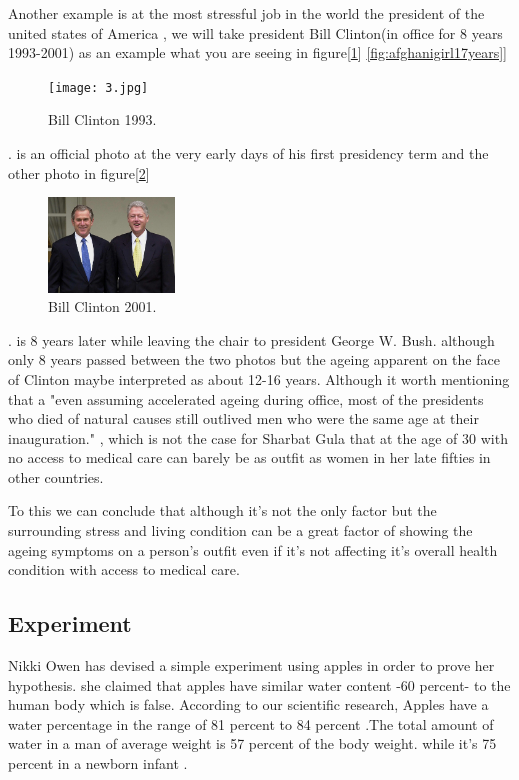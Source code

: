 \documentclass[12pt]{article}
\theoremstyle{plain}
\theoremstyle{definition}
\theoremstyle{remark}
\begin{document}
\begin{itemize}
Another example is at the most stressful job in the world the president of the united states of America , we will take president Bill Clinton(in office for 8 years 1993-2001) as an example what you are seeing in figure[\ref{fig:clinton}]
\ref{fig:afghanigirl17years}]
\begin{figure}[hbtp]
	 \centerline{\texttt{[image: 3.jpg]}}
	 {\caption{Bill Clinton 1993.}\label{fig:clinton}}
\end{figure}.
 is an official photo at the very early days of his first presidency term and the other photo in figure[\ref{fig:clinton8}]
 \begin{figure}[hbtp]
	 \centerline{\includegraphics[width=0.3\textwidth]{4.jpg}}
	 {\caption{Bill Clinton 2001.}\label{fig:clinton8}}
\end{figure}.
  is 8 years later while leaving the chair to president George W. Bush. although only 8 years passed between the two photos but the ageing apparent on the face of Clinton maybe interpreted as about 12-16 years. Although it worth mentioning that a "even assuming accelerated ageing during office, most of the presidents who died of natural causes still outlived men who were the same age at their inauguration." \cite{olshansky2011aging}, which is not the case for Sharbat Gula that at the age of 30 with no access to medical care can barely be as outfit as women in her late fifties in other countries.

To this we can conclude that although it's not the only factor but the surrounding stress and living condition can be a great factor of showing the ageing symptoms on a person's outfit even if it's not affecting it's overall health condition with access to medical care.

\end{itemize}


\subsection{Experiment}
\label{sec:model:subsec:experiment}

Nikki Owen has devised a simple experiment using apples in order to prove her hypothesis. she claimed that apples have similar water content -60 percent- to the human body which is false. According to our scientific research, Apples have a water percentage in the range of 81 percent to 84 percent \cite{institute2005dietary}.The total amount of water in a man of average weight is 57 percent of the body weight. while it's 75 percent in a newborn infant \cite{andrew2003diastolic}.
\end{document}
